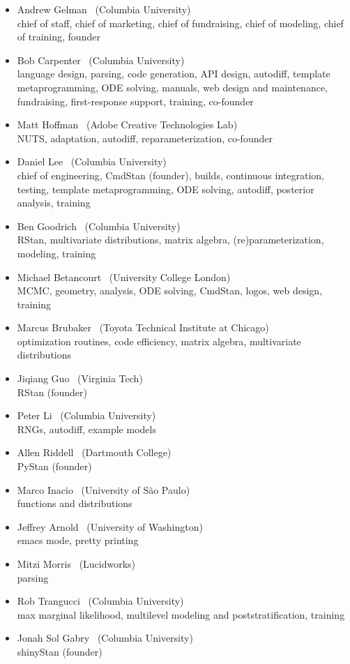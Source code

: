\begin{itemize}
\item Andrew Gelman \ (Columbia University)
\\ {\footnotesize chief of staff, chief of marketing, chief of
  fundraising, chief of modeling, chief of training, founder}
\item Bob Carpenter \ (Columbia University) \\ {\footnotesize language
    design, parsing, code generation, API design, autodiff, template
    metaprogramming, ODE solving, manuals, web design and maintenance,
    fundraising, first-response support, training, co-founder}
\item Matt Hoffman \ (Adobe Creative Technologies Lab)
\\ {\footnotesize NUTS, adaptation, autodiff, reparameterization, co-founder}
\item Daniel Lee \   (Columbia University)
\\ {\footnotesize chief of engineering, CmdStan (founder), builds, continuous
  integration, testing, template metaprogramming, ODE solving, autodiff,
  posterior analysis, training}
\item Ben Goodrich \   (Columbia University)
\\ {\footnotesize RStan, multivariate distributions, matrix algebra,
  (re)parameterization, modeling, training}
\item Michael Betancourt \   (University College London)
\\ {\footnotesize MCMC, geometry, analysis, ODE solving, CmdStan,
  logos, web design, training}
\item Marcus Brubaker \   (Toyota Technical Institute at Chicago)
\\ {\footnotesize optimization routines, code efficiency, matrix
  algebra, multivariate distributions}
\item Jiqiang Guo \   (Virginia Tech)
\\ {\footnotesize RStan (founder)}
\item Peter Li \   (Columbia University)
\\ {\footnotesize RNGs, autodiff, example models}
\item Allen Riddell \   (Dartmouth College)
\\ {\footnotesize PyStan (founder)}
\item Marco Inacio \   (University of S\~{a}o Paulo)
\\ {\footnotesize functions and distributions}
\item Jeffrey Arnold \   (University of Washington)
\\ {\footnotesize emacs mode, pretty printing}
\item Mitzi Morris \   (Lucidworks)
\\ {\footnotesize parsing}
\item Rob Trangucci \   (Columbia University)
\\ {\footnotesize max marginal likelihood, multilevel modeling and
  poststratification, training}
\item Jonah Sol Gabry \ (Columbia University)
\\ {\footnotesize shinyStan (founder)}
\end{itemize}


